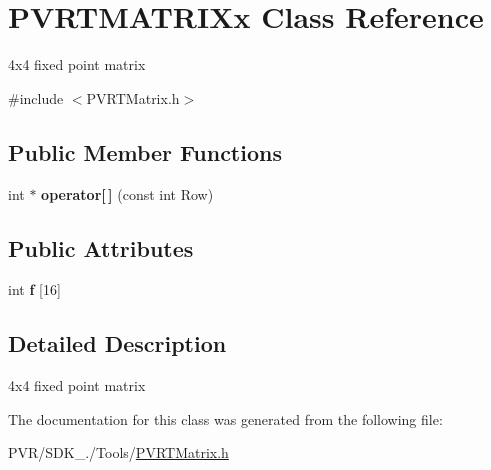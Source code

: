 \hypertarget{class_p_v_r_t_m_a_t_r_i_xx}{\section{P\+V\+R\+T\+M\+A\+T\+R\+I\+Xx Class Reference}
\label{class_p_v_r_t_m_a_t_r_i_xx}
}


4x4 fixed point matrix  




{\ttfamily \#include $<$P\+V\+R\+T\+Matrix.\+h$>$}

\subsection*{Public Member Functions}
\begin{DoxyCompactItemize}
\item 
\hypertarget{class_p_v_r_t_m_a_t_r_i_xx_ae65ffcdeac78b8b1e6dd821a9f545e12}{int $\ast$ {\bfseries operator\mbox{[}$\,$\mbox{]}} (const int Row)}\label{class_p_v_r_t_m_a_t_r_i_xx_ae65ffcdeac78b8b1e6dd821a9f545e12}

\end{DoxyCompactItemize}
\subsection*{Public Attributes}
\begin{DoxyCompactItemize}
\item 
\hypertarget{class_p_v_r_t_m_a_t_r_i_xx_a69e6f00c29a304afd13c957d89123538}{int {\bfseries f} \mbox{[}16\mbox{]}}\label{class_p_v_r_t_m_a_t_r_i_xx_a69e6f00c29a304afd13c957d89123538}

\end{DoxyCompactItemize}


\subsection{Detailed Description}
4x4 fixed point matrix 



 

The documentation for this class was generated from the following file\+:\begin{DoxyCompactItemize}
\item 
P\+V\+R/\+S\+D\+K\+\_./\+Tools/\hyperlink{_p_v_r_t_matrix_8h}{P\+V\+R\+T\+Matrix.\+h}\end{DoxyCompactItemize}
